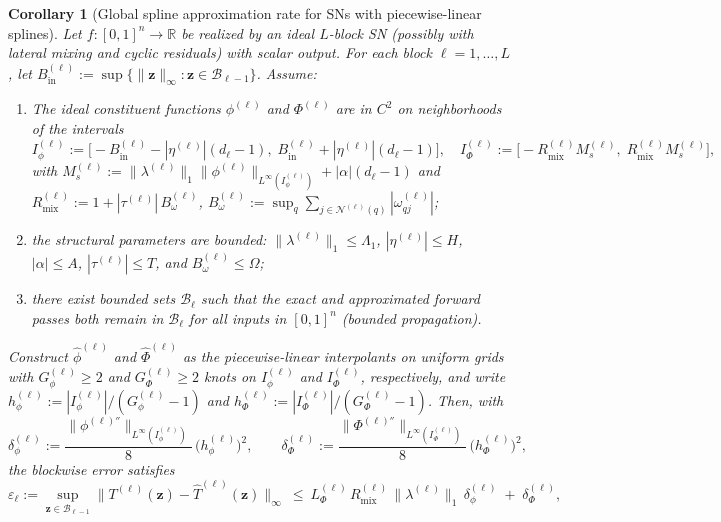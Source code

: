 \documentclass{article}
\theoremstyle{plain}
\newtheorem{corollary}{Corollary}
\theoremstyle{definition}
\theoremstyle{remark}
\begin{document}
\begin{corollary}[Global spline approximation rate for SNs with piecewise-linear splines]\label{cor:sprecher_rate}
Let $f:[0,1]^n\to\mathbb{R}$ be realized by an ideal $L$-block SN (possibly with lateral mixing and cyclic residuals) with scalar output. For each block $\ell=1,\dots,L$, let $B_{\mathrm{in}}^{(\ell)}:=\sup\{\|\mathbf{z}\|_\infty:\mathbf{z}\in\mathcal{B}_{\ell-1}\}$. Assume:
\begin{enumerate}[label=\textup{(\roman*)}]
\item The \emph{ideal constituent} functions $\phi^{(\ell)}$ and $\Phi^{(\ell)}$ are in $C^2$ on neighborhoods of the intervals
$$I_\phi^{(\ell)} := \bigl[-B_{\mathrm{in}}^{(\ell)}-|\eta^{(\ell)}|(d_{\ell}-1),\; B_{\mathrm{in}}^{(\ell)}+|\eta^{(\ell)}|(d_{\ell}-1)\bigr],
\quad
I_\Phi^{(\ell)} := \bigl[-R_{\mathrm{mix}}^{(\ell)}M_s^{(\ell)},\; R_{\mathrm{mix}}^{(\ell)}M_s^{(\ell)}\bigr],$$
with $M_s^{(\ell)}:=\|\lambda^{(\ell)}\|_{1}\|\phi^{(\ell)}\|_{L^\infty(I_\phi^{(\ell)})}+|\alpha|(d_\ell-1)$ and $R_{\mathrm{mix}}^{(\ell)}:=1+|\tau^{(\ell)}|\,B_\omega^{(\ell)}$, $B_\omega^{(\ell)}:=\sup_q\sum_{j\in\mathcal{N}^{(\ell)}(q)}|\omega^{(\ell)}_{qj}|$;
\item the structural parameters are bounded: $\|\lambda^{(\ell)}\|_{1}\le \Lambda_1$, $|\eta^{(\ell)}|\le H$, $|\alpha|\le A$, $|\tau^{(\ell)}|\le T$, and $B_\omega^{(\ell)}\le \Omega$;
\item there exist bounded sets $\mathcal{B}_\ell$ such that the exact and approximated forward passes both remain in $\mathcal{B}_\ell$ for all inputs in $[0,1]^n$ (bounded propagation).
\end{enumerate}
Construct $\hat\phi^{(\ell)}$ and $\hat\Phi^{(\ell)}$ as the piecewise-linear interpolants on uniform grids with $G_\phi^{(\ell)}\ge2$ and $G_\Phi^{(\ell)}\ge2$ knots on $I_\phi^{(\ell)}$ and $I_\Phi^{(\ell)}$, respectively, and write $h_\phi^{(\ell)}:=|I_\phi^{(\ell)}|/(G_\phi^{(\ell)}-1)$ and $h_\Phi^{(\ell)}:=|I_\Phi^{(\ell)}|/(G_\Phi^{(\ell)}-1)$. Then, with
$$\delta_\phi^{(\ell)}:=\frac{\|\phi^{(\ell)''}\|_{L^\infty(I_\phi^{(\ell)})}}{8}\,\bigl(h_\phi^{(\ell)}\bigr)^2, \qquad
\delta_\Phi^{(\ell)}:=\frac{\|\Phi^{(\ell)''}\|_{L^\infty(I_\Phi^{(\ell)})}}{8}\,\bigl(h_\Phi^{(\ell)}\bigr)^2,$$
the blockwise error satisfies
$$\varepsilon_\ell
:=\sup_{\mathbf{z}\in\mathcal{B}_{\ell-1}}\|T^{(\ell)}(\mathbf{z})-\hat T^{(\ell)}(\mathbf{z})\|_\infty
\ \le\ L_{\Phi}^{(\ell)}\,R_{\mathrm{mix}}^{(\ell)}\,\|\lambda^{(\ell)}\|_{1}\,\delta_\phi^{(\ell)}\;+\;\delta_\Phi^{(\ell)},$$

\end{corollary}
\end{document}
